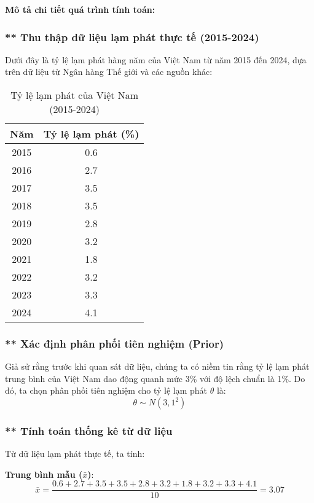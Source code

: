 \textbf{Mô tả chi tiết quá trình tính toán:}
\subsubsection{** Thu thập dữ liệu lạm phát thực tế (2015-2024)}
Dưới đây là tỷ lệ lạm phát hàng năm của Việt Nam từ năm 2015 đến 2024, dựa trên dữ liệu từ Ngân hàng Thế giới và các nguồn khác:

\begin{table}[H] %
    \centering
    \begin{tabular}{|c|c|}
        \hline
        \textbf{Năm} & \textbf{Tỷ lệ lạm phát (\%)} \\
        \hline
        2015 & 0.6 \\
        2016 & 2.7 \\
        2017 & 3.5 \\
        2018 & 3.5 \\
        2019 & 2.8 \\
        2020 & 3.2 \\
        2021 & 1.8 \\
        2022 & 3.2 \\
        2023 & 3.3 \\
        2024 & 4.1 \\
        \hline
    \end{tabular}
    \caption{Tỷ lệ lạm phát của Việt Nam (2015-2024)}
    \label{tab:inflation}
\end{table}

\subsubsection{** Xác định phân phối tiên nghiệm (Prior)}
Giả sử rằng trước khi quan sát dữ liệu, chúng ta có niềm tin rằng tỷ lệ lạm phát trung bình của Việt Nam dao động quanh mức 3\% với độ lệch chuẩn là 1\%. Do đó, ta chọn phân phối tiên nghiệm cho tỷ lệ lạm phát $\theta$ là:
\begin{equation}
    \theta \sim N(3, 1^2)
\end{equation}

\subsubsection{** Tính toán thống kê từ dữ liệu}
Từ dữ liệu lạm phát thực tế, ta tính:

\textbf{Trung bình mẫu ($\bar{x}$)}:
\begin{equation}
    \bar{x} = \frac{0.6 + 2.7 + 3.5 + 3.5 + 2.8 + 3.2 + 1.8 + 3.2 + 3.3 + 4.1}{10} = 3.07
\end{equation}

